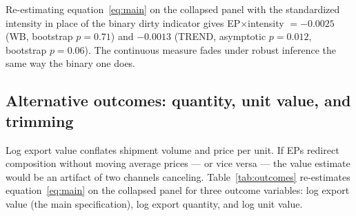 \documentclass[12pt]{article}
\begin{document}
Re-estimating equation~\eqref{eq:main} on the collapsed panel with the standardized
intensity in place of the binary dirty indicator gives EP$\times$intensity $= -0.0025$
(WB, bootstrap $p = 0.71$) and $-0.0013$ (TREND, asymptotic $p = 0.012$, bootstrap
$p = 0.06$). The continuous measure fades under robust inference the same way the binary
one does.

\subsection{Alternative outcomes: quantity, unit value, and trimming}

Log export value conflates shipment volume and price per unit. If EPs redirect
composition without moving average prices --- or vice versa --- the value estimate would
be an artifact of two channels canceling. Table~\ref{tab:outcomes} re-estimates
equation~\eqref{eq:main} on the collapsed panel for three outcome variables: log export
value (the main specification), log export quantity, and log unit value.
\end{document}
